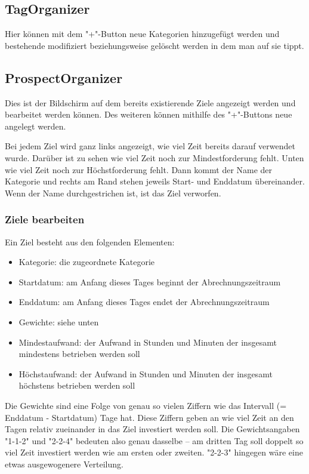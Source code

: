 \documentclass[10pt,a4paper]{article}
\begin{document}
\subsection{TagOrganizer}
Hier können mit dem "+"-Button neue Kategorien hinzugefügt werden und bestehende modifiziert beziehungsweise gelöscht werden in dem man auf sie tippt.

\subsection{ProspectOrganizer}
Dies ist der Bildschirm auf dem bereits existierende Ziele angezeigt werden und bearbeitet werden können. Des weiteren können mithilfe des "+"-Buttons neue angelegt werden.

Bei jedem Ziel wird ganz links angezeigt, wie viel Zeit bereits darauf verwendet wurde. Darüber ist zu sehen wie viel Zeit noch zur Mindestforderung fehlt. Unten wie viel Zeit noch zur Höchstforderung fehlt. Dann kommt der Name der Kategorie und rechts am Rand stehen jeweils Start- und Enddatum übereinander.
Wenn der Name durchgestrichen ist, ist das Ziel verworfen.
\subsubsection{Ziele bearbeiten}
Ein Ziel besteht aus den folgenden Elementen:
\begin{itemize}
	\item \textsf{Kategorie:} die zugeordnete Kategorie
	\item \textsf{Startdatum:} am Anfang dieses Tages beginnt der Abrechnungszeitraum
	\item \textsf{Enddatum:} am Anfang dieses Tages endet der Abrechnungszeitraum 
	\item \textsf{Gewichte:} siehe unten
	\item \textsf{Mindestaufwand:} der Aufwand in Stunden und Minuten der insgesamt mindestens betrieben werden soll
	\item \textsf{Höchstaufwand:} der Aufwand in Stunden und Minuten der insgesamt höchstens betrieben werden soll
\end{itemize}
Die Gewichte sind eine Folge von \textsf{genau} so vielen Ziffern wie das Intervall (= Enddatum - Startdatum) Tage hat. Diese Ziffern geben an wie viel Zeit an den Tagen relativ zueinander in das Ziel investiert werden soll. Die Gewichtsangaben "1-1-2" und "2-2-4" bedeuten also genau dasselbe – am dritten Tag soll doppelt so viel Zeit investiert werden wie am ersten oder zweiten. "2-2-3" hingegen wäre eine etwas ausgewogenere Verteilung.
\end{document}
